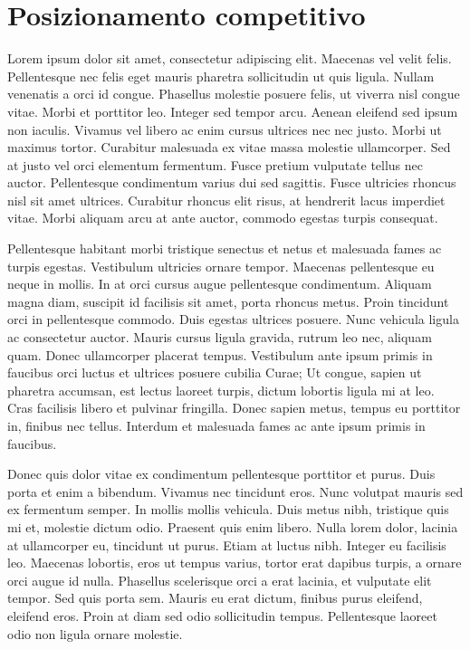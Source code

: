\documentclass[11pt,fleqn]{book} %
\begin{document}
\newpage
\section{Posizionamento competitivo}
Lorem ipsum dolor sit amet, consectetur adipiscing elit. Maecenas vel velit felis. Pellentesque nec felis eget mauris pharetra sollicitudin ut quis ligula. Nullam venenatis a orci id congue. Phasellus molestie posuere felis, ut viverra nisl congue vitae. Morbi et porttitor leo. Integer sed tempor arcu. Aenean eleifend sed ipsum non iaculis. Vivamus vel libero ac enim cursus ultrices nec nec justo. Morbi ut maximus tortor. Curabitur malesuada ex vitae massa molestie ullamcorper. Sed at justo vel orci elementum fermentum. Fusce pretium vulputate tellus nec auctor. Pellentesque condimentum varius dui sed sagittis. Fusce ultricies rhoncus nisl sit amet ultrices. Curabitur rhoncus elit risus, at hendrerit lacus imperdiet vitae. Morbi aliquam arcu at ante auctor, commodo egestas turpis consequat.

Pellentesque habitant morbi tristique senectus et netus et malesuada fames ac turpis egestas. Vestibulum ultricies ornare tempor. Maecenas pellentesque eu neque in mollis. In at orci cursus augue pellentesque condimentum. Aliquam magna diam, suscipit id facilisis sit amet, porta rhoncus metus. Proin tincidunt orci in pellentesque commodo. Duis egestas ultrices posuere. Nunc vehicula ligula ac consectetur auctor. Mauris cursus ligula gravida, rutrum leo nec, aliquam quam. Donec ullamcorper placerat tempus. Vestibulum ante ipsum primis in faucibus orci luctus et ultrices posuere cubilia Curae; Ut congue, sapien ut pharetra accumsan, est lectus laoreet turpis, dictum lobortis ligula mi at leo. Cras facilisis libero et pulvinar fringilla. Donec sapien metus, tempus eu porttitor in, finibus nec tellus. Interdum et malesuada fames ac ante ipsum primis in faucibus.

Donec quis dolor vitae ex condimentum pellentesque porttitor et purus. Duis porta et enim a bibendum. Vivamus nec tincidunt eros. Nunc volutpat mauris sed ex fermentum semper. In mollis mollis vehicula. Duis metus nibh, tristique quis mi et, molestie dictum odio. Praesent quis enim libero. Nulla lorem dolor, lacinia at ullamcorper eu, tincidunt ut purus. Etiam at luctus nibh. Integer eu facilisis leo. Maecenas lobortis, eros ut tempus varius, tortor erat dapibus turpis, a ornare orci augue id nulla. Phasellus scelerisque orci a erat lacinia, et vulputate elit tempor. Sed quis porta sem. Mauris eu erat dictum, finibus purus eleifend, eleifend eros. Proin at diam sed odio sollicitudin tempus. Pellentesque laoreet odio non ligula ornare molestie.
\end{document}
